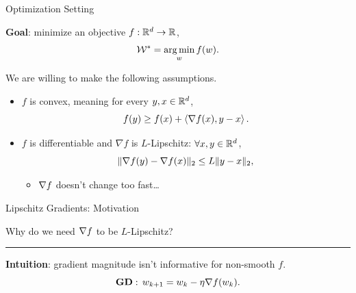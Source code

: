 \documentclass[usenames,dvipsnames,mathserif,notheorems]{beamer}
\newcommand{\horizontalrule}{
	{
			\vspace{-0.5em}
			\center \rule{\textwidth}{0.1em}
			\vspace{-0.2em}
		}
}
\newcommand{\bad}[1]{\textcolor{bad}{#1}}
\newcommand{\good}[1]{\textcolor{good}{#1}}
\begin{document}
\begin{frame}{Optimization Setting}

    \textbf{Goal}: minimize an \bad{objective} \( f : \mathbb{R}^d \rightarrow \mathbb{R}\),
    \[
        \mathcal{W}^* = \mathop{\rm arg\,min}_{w} f(w).
    \]
    \pause

    We are willing to make the following assumptions.
    \vspace{1ex}
    \pause
    \begin{itemize}
        \item \( f \) is \good{convex}, meaning for every \( y, x \in \mathbb{R}^d\),
              \[
                  f(y) \geq f(x) + \left\langle\nabla f(x), y - x\right\rangle.
              \]
              \pause

        \item \( f \) is \good{differentiable} and \( \nabla f \) is
              \good{\( L \)-Lipschitz}: \( \forall x, y \in \mathbb{R}^d \),
              \[
                  \|\nabla f(y) - \nabla f(x)\|_2 \leq L \|y - x\|_2,
              \]
              \pause

              \vspace{-2ex}
              \begin{itemize}
                  \item \( \nabla f \) doesn't change \bad{too fast}\ldots
              \end{itemize}
    \end{itemize}
\end{frame}

\begin{frame}{Lipschitz Gradients: Motivation}
    \begin{center}
        \Large
        Why do we need \( \nabla f \) to be \( L \)-Lipschitz?
    \end{center}

    \pause
    \horizontalrule

    \textbf{Intuition}: gradient magnitude isn't informative for non-smooth \( f \).
    \[
        \textbf{GD}: \, w_{k+1} = w_k - \eta \nabla f(w_k).
    \]
    \pause

    \vspace{2ex}

    \begin{center}
    \end{center}

\end{frame}
\end{document}
